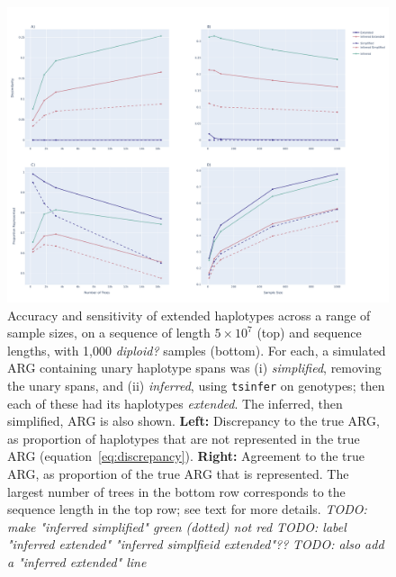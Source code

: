 \documentclass[10pt,twoside,lineno]{gsajnl}
\newcommand{\tsinfer}{\texttt{tsinfer}}
\newcommand{\comment}[1]{{\color{violet} \it #1}}
\begin{document}
\begin{figure}
	\begin{center}
        \includegraphics[width=\textwidth]{dissimilarity.pdf}
	\end{center}
    \caption{
        Accuracy and sensitivity of extended haplotypes
        across a range of sample sizes, on a sequence of length $5\times10^7$ (top)
        and sequence lengths, with 1,000 \comment{diploid?} samples (bottom).
        For each, a simulated ARG containing unary haplotype spans
        was (i) \emph{simplified}, removing the unary spans,
        and (ii) \emph{inferred}, using \tsinfer{} on genotypes;
        then each of these had its haplotypes \emph{extended}.
        The inferred, then simplified, ARG is also shown.
        \textbf{Left:} Discrepancy to the true ARG,
        as proportion of haplotypes that are not represented in the true ARG
        (equation~\eqref{eq:discrepancy}).
        \textbf{Right:} Agreement to the true ARG,
        as proportion of the true ARG that is represented.
        The largest number of trees in the bottom row corresponds
        to the sequence length in the top row;
        see text for more details.
        \comment{TODO: make "inferred simplified" green (dotted) not red}
        \comment{TODO: label "inferred extended" "inferred simplfieid extended"??}
        \comment{TODO: also add a "inferred extended" line}
    }
    \label{fig:discrepancy}
\end{figure}
\end{document}
